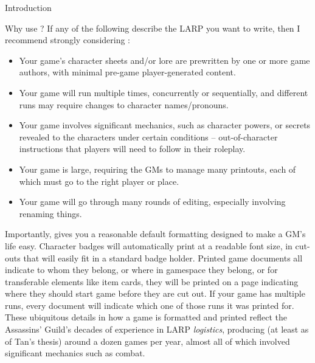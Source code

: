 \documentclass[sheet]{GameTexBase}
\begin{document}
\begin{section}{Introduction}
\begin{subsection}{Why use \gametex{}?}
If any of the following describe the LARP you want to write, then I recommend strongly considering \gametex{}:
\begin{itemize}
\item Your game's character sheets and/or lore are prewritten by one or more game authors, with minimal pre-game player-generated content.
\item Your game will run multiple times, concurrently or sequentially, and different runs may require changes to character names/pronouns.
\item Your game involves significant mechanics, such as character powers, or secrets revealed to the characters under certain conditions -- out-of-character instructions that players will need to follow in their roleplay.
\item Your game is large, requiring the GMs to manage many printouts, each of which must go to the right player or place.
\item Your game will go through many rounds of editing, especially involving renaming things.
\end{itemize}

Importantly, \gametex{} gives you a reasonable default formatting designed to make a GM's life easy.  Character badges will automatically print at a readable font size, in cut-outs that will easily fit in a standard badge holder.  Printed game documents all indicate to whom they belong, or where in gamespace they belong, or for transferable elements like item cards, they will be printed on a page indicating where they should start game before they are cut out.  If your game has multiple runs, every document will indicate which one of those runs it was printed for.  These ubiquitous details in how a game is formatted and printed reflect the Assassins' Guild's decades of experience in LARP \emph{logistics}, producing (at least as of Tan's thesis) around a dozen games per year, almost all of which involved significant mechanics such as combat.
\end{subsection}
\end{section}
\end{document}
